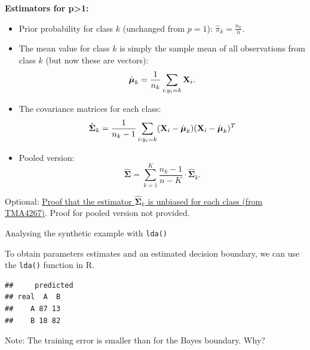 \documentclass[10pt,ignorenonframetext,]{beamer}
\newenvironment{Shaded}{\begin{snugshade}}{\end{snugshade}}
\newcommand{\KeywordTok}[1]{\textcolor[rgb]{0.13,0.29,0.53}{\textbf{#1}}}
\newcommand{\DataTypeTok}[1]{\textcolor[rgb]{0.13,0.29,0.53}{#1}}
\newcommand{\StringTok}[1]{\textcolor[rgb]{0.31,0.60,0.02}{#1}}
\newcommand{\OperatorTok}[1]{\textcolor[rgb]{0.81,0.36,0.00}{\textbf{#1}}}
\newcommand{\NormalTok}[1]{#1}
\begin{document}
\begin{frame}

\textbf{Estimators for p\textgreater{}1:}

\begin{itemize}
\item
  Prior probability for class \(k\) (unchanged from \(p=1\)):
  \(\hat{\pi}_k = \frac{n_k}{n}.\)
\item
  The mean value for class \(k\) is simply the sample mean of all
  observations from class \(k\) (but now these are vectors):
  \[\hat{\boldsymbol{\mu}}_k = \frac{1}{n_k}\sum_{i:y_i=k} {\bf X}_i.\]
\item
  The covariance matrices for each class:
  \[\hat{\boldsymbol{\Sigma}}_k=\frac{1}{n_k-1}\sum_{i:y_i=k} ({\bf X}_i-\hat{\boldsymbol{\mu}}_k ) ({\bf X}_i-\hat{\boldsymbol{\mu}}_k)^T\]
\item
  Pooled version:
  \[\hat{\boldsymbol{\Sigma}}= \sum_{k=1}^K \frac{n_k - 1}{n - K} \cdot \hat{\boldsymbol{\Sigma}}_k.\]
\end{itemize}

Optional:
\href{https://www.math.ntnu.no/emner/TMA4268/2018v/notes/ProofMeanS.pdf}{Proof
that the estimator \(\hat{\boldsymbol{\Sigma}}_k\) is unbiased for each
class (from TMA4267)}. Proof for pooled version not provided.

\end{frame}

\begin{frame}[fragile]

\begin{block}{Analysing the synthetic example with \texttt{lda()}}

\vspace{2mm}

To obtain parameters estimates and an estimated decision boundary, we
can use the \texttt{lda()} function in R.

\begin{Shaded}
\end{Shaded}

\begin{verbatim}
##     predicted
## real  A  B
##    A 87 13
##    B 18 82
\end{verbatim}

Note: The training error is smaller than for the Bayes boundary. Why?

\end{block}

\end{frame}
\end{document}
